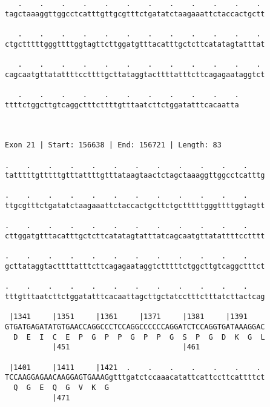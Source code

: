 \documentclass{article}
\begin{document}
\begin{Verbatim}
   .    .    .    .    .    .    .    .    .    .    .    . 
tagctaaaggttggcctcatttgttgcgtttctgatatctaagaaattctaccactgctt
                                                            
   .    .    .    .    .    .    .    .    .    .    .    . 
ctgctttttgggttttggtagttcttggatgtttacatttgctcttcatatagtatttat
                                                            
   .    .    .    .    .    .    .    .    .    .    .    . 
cagcaatgttatattttccttttgcttataggtacttttatttcttcagagaataggtct
                                                            
   .    .    .    .    .    .    .    .    .    .    .
ttttctggcttgtcaggctttcttttgtttaatcttctggatatttcacaatta
                                                      
                                                      
 
Exon 21 | Start: 156638 | End: 156721 | Length: 83
 
.    .    .    .    .    .    .    .    .    .    .    .    
tatttttgtttttgtttattttgtttataagtaactctagctaaaggttggcctcatttg
                                                            
.    .    .    .    .    .    .    .    .    .    .    .    
ttgcgtttctgatatctaagaaattctaccactgcttctgctttttgggttttggtagtt
                                                            
.    .    .    .    .    .    .    .    .    .    .    .    
cttggatgtttacatttgctcttcatatagtatttatcagcaatgttatattttcctttt
                                                            
.    .    .    .    .    .    .    .    .    .    .    .    
gcttataggtacttttatttcttcagagaataggtctttttctggcttgtcaggctttct
                                                            
.    .    .    .    .    .    .    .    .    .    .    .    
tttgtttaatcttctggatatttcacaattagcttgctatcctttctttatcttactcag
                                                            
 |1341     |1351     |1361     |1371     |1381     |1391    
GTGATGAGATATGTGAACCAGGCCCTCCAGGCCCCCCAGGATCTCCAGGTGATAAAGGAC
  D  E  I  C  E  P  G  P  P  G  P  P  G  S  P  G  D  K  G  L
           |451                          |461               
  
 |1401     |1411     |1421  .    .    .    .    .    .    . 
TCCAAGGAGAACAAGGAGTGAAAGgtttgatctccaaacatattcattccttcattttct
  Q  G  E  Q  G  V  K  G                                    
           |471                                             
  

\end{Verbatim}
\end{document}
